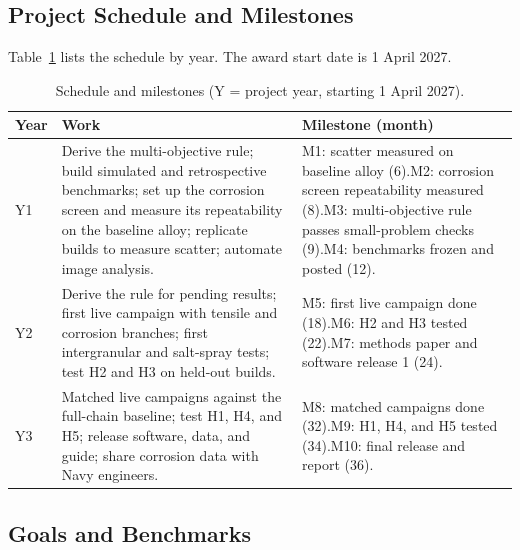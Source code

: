 \documentclass[12pt,letterpaper]{article}
\begin{document}
\subsection{Project Schedule and Milestones}

Table~\ref{tab:schedule} lists the schedule by year. The award start date is
1 April 2027.

\begin{table}[h]
\centering
\caption{Schedule and milestones (Y = project year, starting 1 April 2027).}
\label{tab:schedule}
\renewcommand{\arraystretch}{1.15}
\begin{tabularx}{\textwidth}{@{}p{0.4in}>{\raggedright\arraybackslash}X>{\raggedright\arraybackslash}p{2.05in}@{}}
\toprule
\textbf{Year} & \textbf{Work} & \textbf{Milestone (month)} \\
\midrule
Y1 & Derive the multi-objective rule; build simulated and retrospective
benchmarks; set up the corrosion screen and measure its repeatability on the
baseline alloy; replicate builds to measure scatter; automate image analysis.
& M1: scatter measured on baseline alloy (6).\newline M2: corrosion screen
repeatability measured (8).\newline M3: multi-objective rule passes
small-problem checks (9).\newline M4: benchmarks frozen and posted (12). \\
Y2 & Derive the rule for pending results; first live campaign with tensile and
corrosion branches; first intergranular and salt-spray tests; test H2 and H3
on held-out builds. & M5: first live campaign done (18).\newline M6: H2 and H3
tested (22).\newline M7: methods paper and software release 1 (24). \\
Y3 & Matched live campaigns against the full-chain baseline; test H1, H4, and
H5; release software, data, and guide; share corrosion data with Navy
engineers. & M8: matched campaigns done (32).\newline M9: H1, H4, and H5
tested (34).\newline M10: final release and report (36). \\
\bottomrule
\end{tabularx}
\end{table}

\subsection{Goals and Benchmarks}
\end{document}
